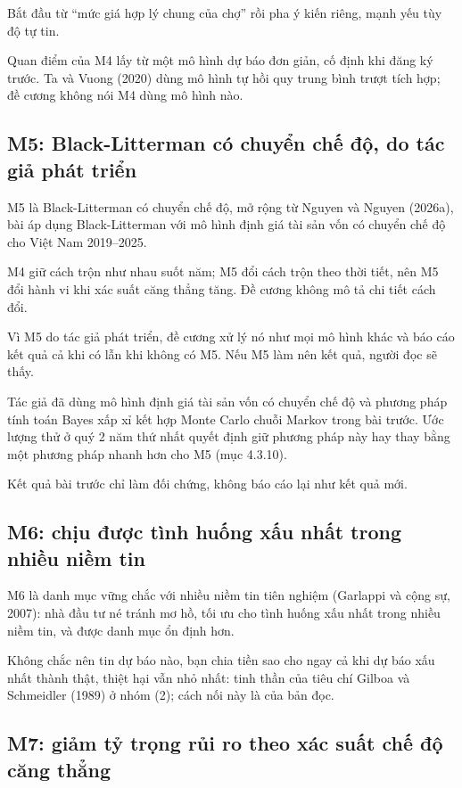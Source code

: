 Bắt đầu từ “mức giá hợp lý chung của chợ” rồi pha ý kiến riêng, mạnh yếu tùy độ tự tin.

Quan điểm của M4 lấy từ một mô hình dự báo đơn giản, cố định khi đăng ký trước. Ta và Vuong (2020) dùng mô hình tự hồi quy trung bình trượt tích hợp; đề cương không nói M4 dùng mô hình nào.

\subsection{M5: Black-Litterman có chuyển chế độ, do tác giả phát triển}

M5 là Black-Litterman có chuyển chế độ, mở rộng từ Nguyen và Nguyen (2026a), bài áp dụng Black-Litterman với mô hình định giá tài sản vốn có chuyển chế độ cho Việt Nam 2019--2025.

M4 giữ cách trộn như nhau suốt năm; M5 đổi cách trộn theo thời tiết, nên M5 đổi hành vi khi xác suất căng thẳng tăng. Đề cương không mô tả chi tiết cách đổi.

Vì M5 do tác giả phát triển, đề cương xử lý nó như mọi mô hình khác và báo cáo kết quả cả khi có lẫn khi không có M5. Nếu M5 làm nên kết quả, người đọc sẽ thấy.

Tác giả đã dùng mô hình định giá tài sản vốn có chuyển chế độ và phương pháp tính toán Bayes xấp xỉ kết hợp Monte Carlo chuỗi Markov trong bài trước. Ước lượng thử ở quý 2 năm thứ nhất quyết định giữ phương pháp này hay thay bằng một phương pháp nhanh hơn cho M5 (mục 4.3.10).

Kết quả bài trước chỉ làm đối chứng, không báo cáo lại như kết quả mới.

\subsection{M6: chịu được tình huống xấu nhất trong nhiều niềm tin}

M6 là danh mục vững chắc với nhiều niềm tin tiên nghiệm (Garlappi và cộng sự, 2007): nhà đầu tư né tránh mơ hồ, tối ưu cho tình huống xấu nhất trong nhiều niềm tin, và được danh mục ổn định hơn.

Không chắc nên tin dự báo nào, bạn chia tiền sao cho ngay cả khi dự báo xấu nhất thành thật, thiệt hại vẫn nhỏ nhất: tinh thần của tiêu chí Gilboa và Schmeidler (1989) ở nhóm (2); cách nối này là của bản đọc.

\subsection{M7: giảm tỷ trọng rủi ro theo xác suất chế độ căng thẳng}

